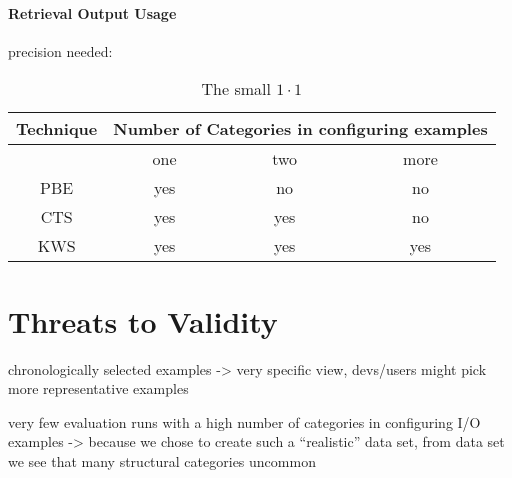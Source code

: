 \documentclass[\myrootdir/main.tex]{subfiles}
\begin{document}
\paragraph{Retrieval Output Usage}
precision needed:

\begin{table}[htbp]
\begin{tabular}{ |c||c|c|c| }
  Technique & \multicolumn{3}{|c|}{Number of Categories in configuring examples} \\
  \hline
  & one & two & more \\
  PBE & yes & no & no \\ 
  CTS & yes & yes & no \\ 
  KWS & yes & yes & yes \\ 
  \hline
\end{tabular}
\caption{The small $1 \cdot 1$}
\label{tab:101}
\end{table}

\section{Threats to Validity}
chronologically selected examples -> very specific view, devs/users might pick more representative examples

very few evaluation runs with a high number of categories in configuring I/O examples -> because we chose to create such a ``realistic'' data set, from data set we see that many structural categories uncommon
\end{document}
